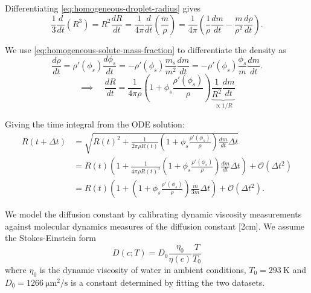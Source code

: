 \documentclass[12pt]{report}
\begin{document}
Differentiating \eqref{eq:homogeneous-droplet-radius} gives
\begin{equation}
  \frac{1}{3} \frac{d}{dt} \left( R^3 \right)
  = R^2 \frac{dR}{dt}
  = \frac{1}{4\pi} \frac{d}{dt} \left( \frac{m}{\rho} \right)
  = \frac{1}{4\pi} \left(
  \frac{1}{\rho} \frac{d m}{dt}
  - \frac{m}{\rho^2} \frac{d \rho}{dt}
  \right).
\end{equation}

We use \eqref{eq:homogeneous-solute-mass-fraction} to differentiate the density as
\begin{equation*}
  \frac{d\rho}{dt}
  = \rho'(\phi_s) \frac{d\phi_s}{dt}
  = -\rho'(\phi_s) \frac{m_s}{m^2} \frac{dm}{dt}
  = -\rho'(\phi_s) \frac{\phi_s}{m} \frac{dm}{dt}.
\end{equation*}
\begin{equation}
  \implies \quad \frac{dR}{dt}
  = \frac{1}{4\pi \rho} \left(
  1 + \phi_s \frac{\rho'(\phi_s)}{\rho}
  \right)
  \underbrace{\frac{1}{R^2} \frac{dm}{dt}}_{\propto 1/R}
\end{equation}

Giving the time integral from the ODE solution:
\begin{equation}
  \begin{aligned}
    R(t + \Delta t)
    &= \sqrt{R(t)^2 + \frac{1}{2\pi \rho R(t)}
      \left(
      1 + \phi_s \frac{\rho'(\phi_s)}{\rho}
      \right)
      \frac{dm}{dt} \Delta t} \\
    &= R(t) \left(
    1 + \frac{1}{4\pi \rho R(t)^3}
    \left(
    1 + \phi_s \frac{\rho'(\phi_s)}{\rho}
    \right)
    \frac{dm}{dt} \Delta t
    \right)
    + \mathcal{O}(\Delta t^2) \\
    &= R(t) \left(
    1 +
    \left(
    1 + \phi_s \frac{\rho'(\phi_s)}{\rho}
    \right)
    \frac{\dot{m}}{3m} \Delta t
    \right)
    + \mathcal{O}(\Delta t^2).
  \end{aligned}
\end{equation}

We model the diffusion constant by calibrating dynamic viscosity measurements
 against molecular dynamics measures of the diffusion constant [2cm].
We assume the Stokes-Einstein form
\begin{equation}
  D(c;T) = D_0 \frac{\eta_0}{\eta(c)} \frac{T}{T_0}
\end{equation}
where $\eta_0$ is the dynamic viscosity of water in ambient conditions, $T_0 = \SI{293}{\kelvin}$ and $D_0 = \SI{1266}{\micro\metre^2\per\second}$ is a constant determined by fitting the two datasets.
\end{document}
